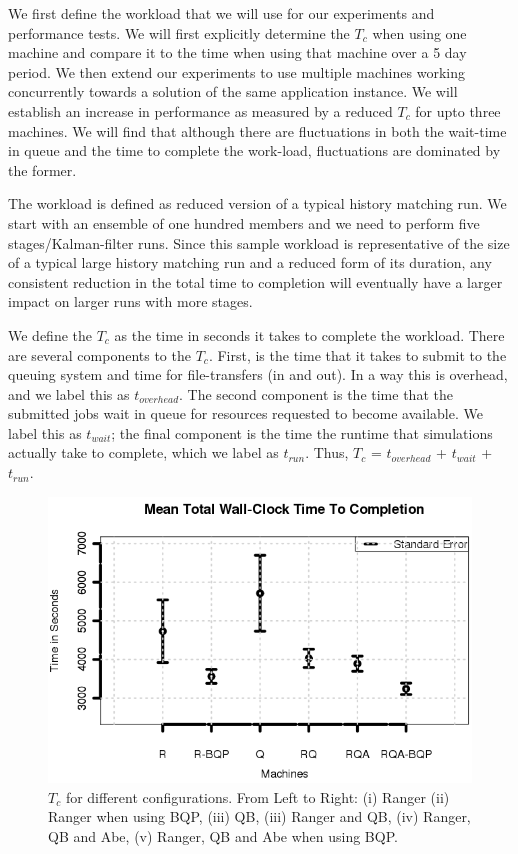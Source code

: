 \documentclass{sig-alternate}
\newcommand{\tc}{$T_c$ }
\newcommand{\tcnsp}{$T_c$}
\newcommand{\up}{\vspace*{-0.3em}}
\begin{document}
We first define the workload that we will use for our experiments and
performance tests. We will first explicitly determine the \tc when
using one machine and compare it to the time when using that machine
over a 5 day period. We then extend our experiments to use multiple
machines working concurrently towards a solution of the same
application instance.  We will establish an increase in performance as
measured by a reduced \tc for upto three machines.  We will find that
although there are fluctuations in both the wait-time in queue and the
time to complete the work-load, fluctuations are dominated by the
former.

The workload is defined as reduced version of a typical history
matching run. We start with an ensemble of one hundred members and we
need to perform five stages/Kalman-filter runs. Since this sample
workload is representative of the size of a typical large history
matching run and a reduced form of its duration, any consistent
reduction in the total time to completion will eventually have a
larger impact on larger runs with more stages.

We define the \tc as the time in seconds it takes to complete the
workload. There are several components to the \tcnsp. First, is the
time that it takes to submit to the queuing system and time for
file-transfers (in and out). In a way this is overhead, and we label
this as $t_{overhead}$.  The second component is the time that the
submitted jobs wait in queue for resources requested to become
available. We label this as $t_{wait}$; the final component is the
time the runtime that simulations actually take to complete, which we
label as $t_{run}$. Thus, \tc = $t_{overhead}$ + $t_{wait}$ +
$t_{run}$.

\begin{figure}
\begin{center}
\includegraphics[scale=0.5]{./figures/Figure7.png}
\end{center}
\up\up\up\up\up\up\up\up\up
\caption{\tc for different configurations.  From Left to Right: (i)
  Ranger (ii) Ranger when using BQP, (iii) QB, (iii) Ranger
  and QB, (iv) Ranger, QB and Abe, (v) Ranger, QB and Abe when
  using BQP.}
\label{fig:results}
\up\up\up\up\up\up\up\up\up\up\up\up
\end{figure}
\end{document}
